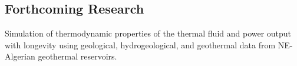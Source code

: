\documentclass[a0,portrait]{a0poster}
\begin{document}
\begin{multicols}{2}

    \section*{Forthcoming Research}

    Simulation of thermodynamic properties of the thermal fluid and power output with longevity using geological, hydrogeological, and geothermal data from NE-Algerian geothermal reservoirs.




\end{multicols}
\end{document}
